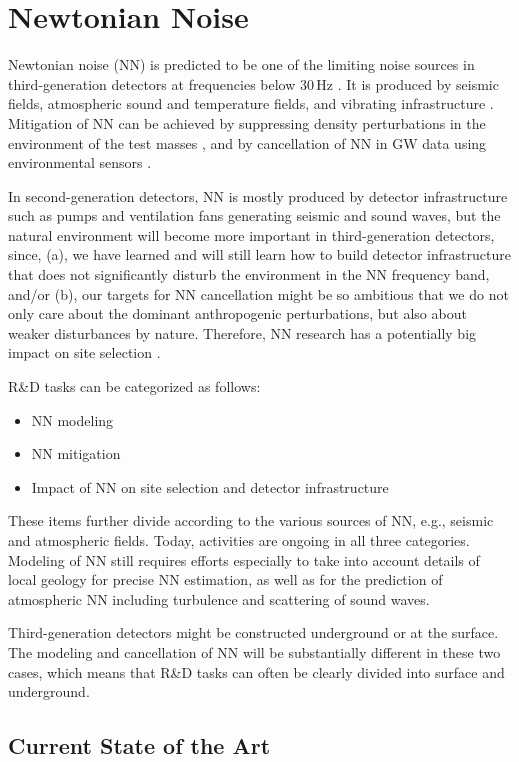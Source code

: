\section{Newtonian Noise}
Newtonian noise (NN) is predicted to be one of the limiting noise sources in third-generation detectors at frequencies below 30\,Hz \cite{Saulson:NN,Har2015}. It is produced by seismic fields, atmospheric sound and temperature fields, and vibrating infrastructure \cite{HuTh1998,BeEA1998,Cre2008,FiEA2018,Har2015}. Mitigation of NN can be achieved by suppressing density perturbations in the environment of the test masses \cite{HaHi2014}, and by cancellation of NN in GW data using environmental sensors \cite{Cel2000,CoEA2016a}.

In second-generation detectors, NN is mostly produced by detector infrastructure such as pumps and ventilation fans generating seismic and sound waves, but the natural environment will become more important in third-generation detectors, since, (a), we have learned and will still learn how to build detector infrastructure that does not significantly disturb the environment in the NN frequency band, and/or (b), our targets for NN cancellation might be so ambitious that we do not only care about the dominant anthropogenic perturbations, but also about weaker disturbances by nature. Therefore, NN research has a potentially big impact on site selection \cite{BeEA2010}. 

R\&D tasks can be categorized as follows:
\begin{itemize}
\item NN modeling
\item NN mitigation
\item Impact of NN on site selection and detector infrastructure
\end{itemize}
These items further divide according to the various sources of NN, e.g., seismic and atmospheric fields. Today, activities are ongoing in all three categories. Modeling of NN still requires efforts especially to take into account details of local geology for precise NN estimation, as well as for the prediction of atmospheric NN including turbulence and scattering of sound waves. 

Third-generation detectors might be constructed underground or at the surface. The modeling and cancellation of NN will be substantially different in these two cases, which means that R\&D tasks can often be clearly divided into surface and underground. 

\subsection{Current State of the Art}
